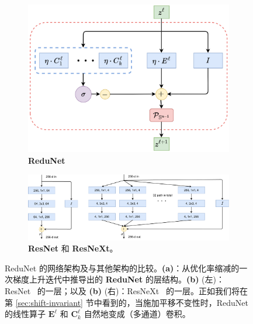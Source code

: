 \documentclass[../../book-main.tex]{subfiles}
\begin{document}
\begin{figure}[t]
    \begin{subfigure}[t]{0.35\textwidth}
        \centering
        \includegraphics[width=\textwidth]{figs_chap4/redunet_layer.png}
        \caption{\textbf{ReduNet}}
    \end{subfigure}
    \hfill
    \begin{subfigure}[t]{0.6\textwidth}
        \centering
        \includegraphics[width=\textwidth]{figs_chap4/resnet_resnext.pdf}
        \caption{\textbf{ResNet} 和 \textbf{ResNeXt}。}
    \end{subfigure}
    \caption{\small ReduNet 的网络架构及与其他架构的比较。\textbf{(a)}：从优化率缩减的一次梯度上升迭代中推导出的 \textbf{ReduNet} 的层结构。\textbf{(b)} (左)：ResNet~\cite{he2016deep} 的一层；以及 \textbf{(b)} (右)：ResNeXt~\cite{ResNEXT} 的一层。正如我们将在第 \ref{sec:shift-invariant} 节中看到的，当施加平移不变性时，ReduNet 的线性算子 $\bm E^\ell$ 和 $\bm{C}_k^\ell$ 自然地变成（多通道）卷积。}
    \label{fig:arch-ReduNet}
\end{figure}
\end{document}
